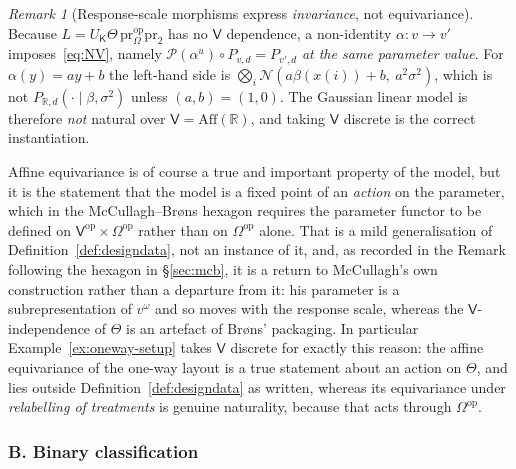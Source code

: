 \documentclass[11pt,a4paper]{article}
\theoremstyle{plain}
\theoremstyle{definition}
\theoremstyle{remark}
\newtheorem{caveat}[theorem]{Remark}
\newcommand{\cat}[1]{\mathsf{#1}}
\newcommand{\catV}{\cat{V}}
\newcommand{\catO}{\cat{\Omega}}
\newcommand{\catK}{\cat{K}}
\newcommand{\Prb}{\mathcal{P}}
\newcommand{\op}{\mathrm{op}}
\newcommand{\pr}{\mathrm{pr}}
\newcommand{\R}{\mathbb{R}}
\newcommand{\Norm}{\mathcal{N}}
\begin{document}
\begin{caveat}[Response-scale morphisms express \emph{invariance}, not
equivariance]\label{cav:scaleV}
Because $L = U_{\catK}\Theta\,\pr_{\catO}^{\op}\pr_{2}$ has no $\catV$
dependence, a non-identity $\alpha \colon v \to v'$ imposes~\eqref{eq:NV},
namely $\Prb(\alpha^{u})\circ P_{v,d} = P_{v',d}$ \emph{at the same parameter
value}. For $\alpha(y)=ay+b$ the left-hand side is
$\bigotimes_{i}\Norm(a\beta(x(i))+b,\ a^{2}\sigma^{2})$, which is not
$P_{\R,d}(\cdot\mid\beta,\sigma^{2})$ unless $(a,b)=(1,0)$. The Gaussian
linear model is therefore \emph{not} natural over
$\catV = \mathrm{Aff}(\R)$, and taking $\catV$ discrete is the correct
instantiation.

Affine equivariance is of course a true and important property of the model,
but it is the statement that the model is a fixed point of an \emph{action} on
the parameter, which in the McCullagh--Br\o ns hexagon requires the parameter
functor to be defined on $\catV^{\op}\times\catO^{\op}$ rather than on
$\catO^{\op}$ alone. That is a mild generalisation of
Definition~\ref{def:designdata}, not an instance of it, and, as recorded in
the Remark following the hexagon in \S\ref{sec:mcb}, it is a return to
McCullagh's own construction rather than a departure from it: his parameter is
a subrepresentation of $v^{\omega}$ and so moves with the response scale,
whereas the $\catV$-independence of $\Theta$ is an artefact of Br\o ns'
packaging. In particular
Example~\ref{ex:oneway-setup} takes $\catV$
discrete for exactly this reason: the affine equivariance of the one-way
layout is a true statement about an action on $\Theta$, and lies outside
Definition~\ref{def:designdata} as written, whereas its equivariance under
\emph{relabelling of treatments} is genuine naturality, because that acts
through $\catO^{\op}$.
\end{caveat}

\subsubsection*{B. Binary classification}
\end{document}

